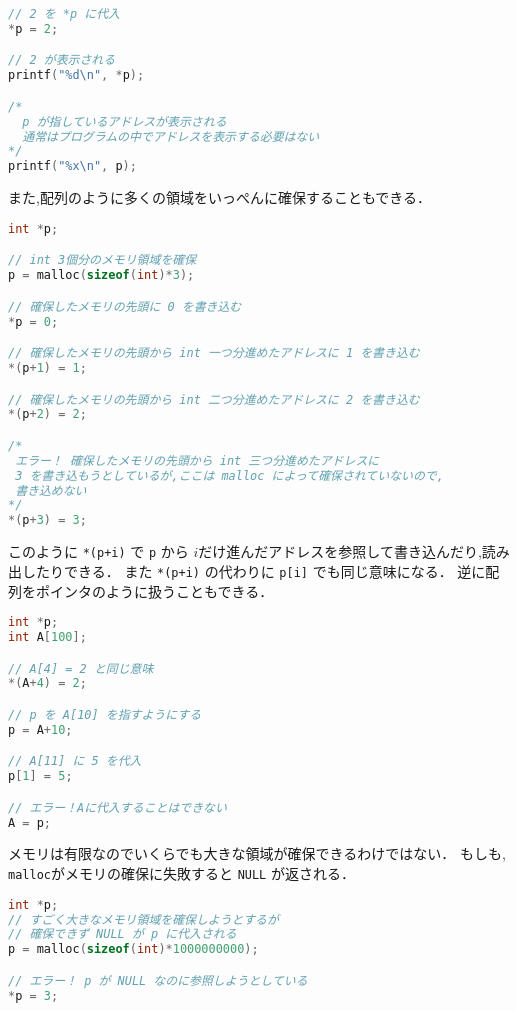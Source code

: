 \documentclass[a4paper,twoside,onecolumn,openany,article]{memoir}
\theoremstyle{remark}
\begin{document}
\begin{lstlisting}[basicstyle=\ttfamily\small,showstringspaces=false,language=C,frame=single]
// 2 を *p に代入
*p = 2;

// 2 が表示される
printf("%d\n", *p);

/*
  p が指しているアドレスが表示される
  通常はプログラムの中でアドレスを表示する必要はない
*/
printf("%x\n", p);
\end{lstlisting}
また,配列のように多くの領域をいっぺんに確保することもできる．
\begin{lstlisting}[basicstyle=\ttfamily\small,showstringspaces=false,language=C,frame=single]
int *p;

// int 3個分のメモリ領域を確保
p = malloc(sizeof(int)*3);

// 確保したメモリの先頭に 0 を書き込む
*p = 0;

// 確保したメモリの先頭から int 一つ分進めたアドレスに 1 を書き込む
*(p+1) = 1;

// 確保したメモリの先頭から int 二つ分進めたアドレスに 2 を書き込む
*(p+2) = 2;

/*
 エラー！ 確保したメモリの先頭から int 三つ分進めたアドレスに
 3 を書き込もうとしているが,ここは malloc によって確保されていないので,
 書き込めない
*/
*(p+3) = 3;
\end{lstlisting}
このように \texttt{*(p+i)} で \texttt{p} から $i$だけ進んだアドレスを参照して書き込んだり,読み出したりできる．
また \texttt{*(p+i)} の代わりに \texttt{p[i]} でも同じ意味になる．
逆に配列をポインタのように扱うこともできる．
\begin{lstlisting}[basicstyle=\ttfamily\small,showstringspaces=false,language=C,frame=single]
int *p;
int A[100];

// A[4] = 2 と同じ意味
*(A+4) = 2;

// p を A[10] を指すようにする
p = A+10;

// A[11] に 5 を代入
p[1] = 5;

// エラー！Aに代入することはできない
A = p;
\end{lstlisting}
メモリは有限なのでいくらでも大きな領域が確保できるわけではない．
もしも, \texttt{malloc}がメモリの確保に失敗すると \texttt{NULL} が返される．
\begin{lstlisting}[basicstyle=\ttfamily\small,showstringspaces=false,language=C,frame=single]
int *p;
// すごく大きなメモリ領域を確保しようとするが
// 確保できず NULL が p に代入される
p = malloc(sizeof(int)*1000000000);

// エラー！ p が NULL なのに参照しようとしている
*p = 3;
\end{lstlisting}
\end{document}
